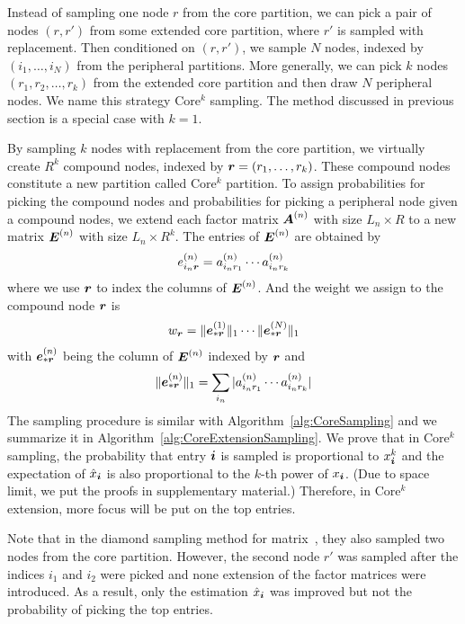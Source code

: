 \documentclass[letterpaper]{article}
\newcommand{\Sca}[3]{{#1}^{(#2)}_{i_#2#3}}%
\newcommand{\anr}[2]{\Sca{a}{#1}{#2}}
\newcommand{\enr}[2]{\Sca{e}{#1}{\V{#2}}}
\newcommand{\V}[1]{{\boldsymbol{{\MakeLowercase{#1}}}}}
\newcommand{\ColVec}[3]{\V{#1}^{(#2)}_{#3}}
\newcommand{\NormColE}[2]{\norm{\ColVec{e}{#1}{*\V{#2}}}{1}}
\newcommand{\predx}{\hat{x}_{\V{i}}}
\newcommand{\M}[1]{{\boldsymbol{{\MakeUppercase{#1}}}}}
\newcommand{\FacMat}[2]{\M{#1}^{(#2)}}
\newcommand{\norm}[2]{\|#1\|_{#2}}
\newcommand{\Alg}[1]{Algorithm~\ref{alg:#1}}
\begin{document}
Instead of sampling one node $r$ from the core partition,
we can pick a pair of nodes $(r,r')$ from some extended core partition,
where $r'$ is sampled with replacement.
Then conditioned on $(r,r')$, we sample $N$ nodes,
indexed by $(i_1,\ldots,i_N)$ from the peripheral partitions.
More generally, we can pick $k$ nodes $(r_1,r_2,\ldots,r_k)$ from the extended core partition
and then draw $N$ peripheral nodes.
We name this strategy Core$^k$ sampling.
The method discussed in previous section is a special case with $k=1$.

By sampling $k$ nodes with replacement from the core partition,
we virtually create $R^k$ compound nodes,
indexed by $\V{r}=(r_1,\ldots,r_k)$.
These compound nodes constitute a new partition called Core$^k$ partition.
To assign probabilities for picking the compound nodes and probabilities for picking a peripheral node given a compound nodes,
we extend each factor matrix $\FacMat{A}{n}$ with size $L_n\times R$ to a new matrix $\M{E}^{(n)}$ with size $L_n\times R^k$.
The entries of $\M{E}^{(n)}$ are obtained by
\begin{align}
\enr{n}{r} = \anr{n}{r_1}\cdots\anr{n}{r_k}
\end{align}
where we use $\V{r}$ to index the columns of $\M{E}^{(n)}$. And the weight we assign to the compound node $\V{r}$ is
\begin{align}
w_{\V{r}} = \NormColE{1}{r}\cdots\NormColE{N}{r}
\end{align}
with $\V{e}_{*\V{r}}^{(n)}$ being the column of $\M{E}^{(n)}$ indexed by $\V{r}$ and
\begin{align}
\NormColE{n}{r} = \sum_{i_n}|\anr{n}{r_1}\cdots\anr{n}{r_k}|
\end{align}
The sampling procedure is similar with \Alg{CoreSampling}
and we summarize it in \Alg{CoreExtensionSampling}.
We prove that in Core$^k$ sampling,
the probability that entry $\V{i}$ is sampled is proportional to $x_{\V{i}}^k$
and the expectation of $\predx$ is also proportional to the $k$-th power of $x_{\V{i}}$.
(Due to space limit, we put the proofs in supplementary material.)
Therefore, in Core$^k$ extension, more focus will be put on the top entries.

Note that in the diamond sampling method for matrix~\cite{BaPiKoSe15},
they also sampled two nodes from the core partition.
However, the second node $r'$ was sampled after the indices $i_1$ and $i_2$ were picked
and none extension of the factor matrices were introduced.
As a result, only the estimation $\predx$ was improved
but not the probability of picking the top entries.
\end{document}

